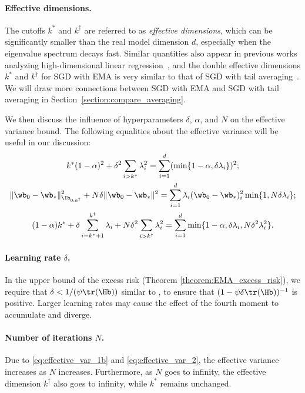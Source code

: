 \documentclass[11pt]{article}
\begin{document}
\paragraph{Effective dimensions.}
The cutoffs $k^*$ and $k^\dagger$ are referred to as \textit{effective dimensions}, which can be significantly smaller than the real model dimension $d$, especially when the eigenvalue spectrum decays fast.
Similar quantities also appear in previous works analyzing high-dimensional linear regression~\citep{zou2021benign, wu2022last, li2023risk}, and the double effective dimensions $k^*$ and $k^\dagger$ for SGD with EMA is very similar to that of SGD with tail averaging~\citep{zou2021benign}.
We will draw more connections between SGD with EMA and SGD with tail averaging in Section~\ref{section:compare_averaging}.

We then discuss the influence of hyperparameters $\delta$, $\alpha$, and $N$ on the effective variance bound. The following equalities about the effective variance will be useful in our discussion:
\begin{gather}
k^*(1-\alpha)^2+\delta^2\sum_{i>k^*}\lambda_i^2=\sum_{i=1}^d(\min\{1-\alpha, \delta\lambda_i\})^2;\label{eq:effective_var_1a}\\
\|\wb_0-\wb_*\|_{\Ib_{0:k^\dagger}}^2+N\delta\|\wb_0-\wb_*\|^2=\sum_{i=1}^d\lambda_i(\wb_0-\wb_*)_i^2\min\{1, N\delta\lambda_i\};\label{eq:effective_var_1b}\\
(1-\alpha)k^*+\delta\sum_{i=k^*+1}^{k^\dagger}\lambda_i+N\delta^2\sum_{i>k^\dagger}\lambda_i^2=\sum_{i=1}^d\min\{1-\alpha, \delta\lambda_i, N\delta^2\lambda_i^2\}.\label{eq:effective_var_2}
\end{gather}

\paragraph{Learning rate $\delta$.}
In the upper bound of the excess risk (Theorem \ref{theorem:EMA_excess_risk}), we require that $\delta<1/(\psi\tr(\Hb))$ similar to \citet{zou2021benign}, to ensure that $(1-\psi\delta\tr(\Hb))^{-1}$ is positive. Larger learning rates may cause the effect of the fourth moment to accumulate and diverge.

\paragraph{Number of iterations $N$.}
Due to \eqref{eq:effective_var_1b} and \eqref{eq:effective_var_2}, the effective variance increases as $N$ increases. Furthermore, as $N$ goes to infinity, the effective dimension $k^\dagger$ also goes to infinity, while $k^*$ remains unchanged.%
\end{document}
